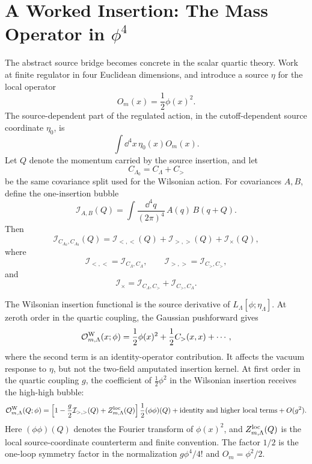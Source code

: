 \section{A Worked Insertion: The Mass Operator in \texorpdfstring{\(\phi^4\)}{phi4}}

The abstract source bridge becomes concrete in the scalar quartic theory.
Work at finite regulator in four Euclidean dimensions, and introduce a source
\(\eta\) for the local operator
\[
  O_m(x)=\frac12\phi(x)^2 .
\]
The source-dependent part of the regulated action, in the cutoff-dependent
source coordinate \(\eta_0\), is
\[
  \int\dd^4x\,\eta_0(x)O_m(x).
\]
Let \(Q\) denote the momentum carried by the source insertion, and let
\[
  C_{\Lambda_0}=C_\Lambda+C_>
\]
be the same covariance split used for the Wilsonian action.  For covariances
\(A,B\), define the one-insertion bubble
\[
  \mathcal I_{A,B}(Q)
  =
  \int\frac{\dd^4q}{(2\pi)^4}\,
  A(q)\,B(q+Q).
\]
Then
\begin{equation}
  \mathcal I_{C_{\Lambda_0},C_{\Lambda_0}}(Q)
  =
  \mathcal I_{<,<}(Q)
  +
  \mathcal I_{>,>}(Q)
  +
  \mathcal I_\times(Q),
  \label{eq:operator-insertion-bubble-covariance-split}
\end{equation}
where
\[
  \mathcal I_{<,<}=\mathcal I_{C_\Lambda,C_\Lambda},
  \qquad
  \mathcal I_{>,>}=\mathcal I_{C_>,C_>},
\]
and
\[
  \mathcal I_\times
  =
  \mathcal I_{C_\Lambda,C_>}
  +
  \mathcal I_{C_>,C_\Lambda}.
\]

The Wilsonian insertion functional is the source derivative of
\(L_\Lambda[\phi;\eta_\Lambda]\).  At zeroth order in the quartic coupling,
the Gaussian pushforward gives
\[
  \mathcal O^{\rm W}_{m,\Lambda}(x;\phi)
  =
  \frac12\phi(x)^2
  +
  \frac12 C_>(x,x)
  +
  \cdots ,
\]
where the second term is an identity-operator contribution.  It affects the
vacuum response to \(\eta\), but not the two-field amputated insertion
kernel.  At first order in the quartic coupling \(g\), the coefficient of
\(\frac12\phi^2\) in the Wilsonian insertion receives the high-high bubble:
\begin{equation}
  \mathcal O^{\rm W}_{m,\Lambda}(Q;\phi)
  =
  \left[
    1-\frac{g}{2}\mathcal I_{>,>}(Q)
    +Z^{\rm loc}_{m,\Lambda}(Q)
  \right]
  \frac12(\phi\phi)(Q)
  +
  \hbox{identity and higher local terms}
  +
  O(g^2).
  \label{eq:wilsonian-mass-insertion-one-loop}
\end{equation}
Here \((\phi\phi)(Q)\) denotes the Fourier transform of \(\phi(x)^2\), and
\(Z^{\rm loc}_{m,\Lambda}(Q)\) is the local source-coordinate counterterm and
finite convention.  The factor \(1/2\) is the one-loop symmetry factor in the
normalization \(g\phi^4/4!\) and \(O_m=\phi^2/2\).


